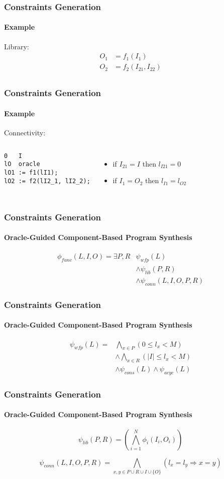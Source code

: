 \begin{frame}
  \frametitle{Constraints Generation}
  \framesubtitle{Example}
Library:
\begin{align*}
O_{1} & = f_{1}(I_1) \\
O_{2} & = f_{2}(I_{21}, I_{22}) \\ 
\end{align*}
\end{frame}

\begin{frame}[fragile]
  \frametitle{Constraints Generation}
  \framesubtitle{Example}
Connectivity:
\begin{columns}
\begin{verbatim}
0   I
lO  oracle
lO1 := f1(lI1);
lO2 := f2(lI2_1, lI2_2);
\end{verbatim}
\begin{itemize}
 \item if $I_{21} = I$ then $l_{I21} = 0$
 \item if $I_{1} = O_2$ then $l_{I1} = l_{O2}$
\end{itemize}
\end{columns}
\end{frame}


\frame
{
  \frametitle{Constraints Generation}
  \framesubtitle{Oracle-Guided Component-Based Program Synthesis}
\begin{align*}
\phi_{func}(L, I, O) = \exists P, R & \psi_{wfp}(L) \\
& \wedge \psi_{lib}(P, R)  \\ 
& \wedge \psi_{conn}(L, I, O, P, R)
\end{align*}
}


\frame
{
  \frametitle{Constraints Generation}
  \framesubtitle{Oracle-Guided Component-Based Program Synthesis}
\begin{align*}
\psi_{wfp}(L) = & \bigwedge_{x \in P} (0 \leq l_x < M) \\
& \wedge \bigwedge_{x \in R} (|I| \leq l_x < M) \\
& \wedge \psi_{cons}(L) \wedge \psi_{acyc}(L)
\end{align*}
}

\frame
{
  \frametitle{Constraints Generation}
  \framesubtitle{Oracle-Guided Component-Based Program Synthesis}
\begin{equation*}
\psi_{lib}(P, R) = \left( \bigwedge^N_{i=1} \phi_i(I_i, O_i) \right)
\end{equation*}

\begin{equation*}
\psi_{conn}(L, I, O, P, R) = \bigwedge_{x, y \in P \cup R \cup I \cup \{O\}} (l_x = l_y \Rightarrow x = y)
\end{equation*}
}
